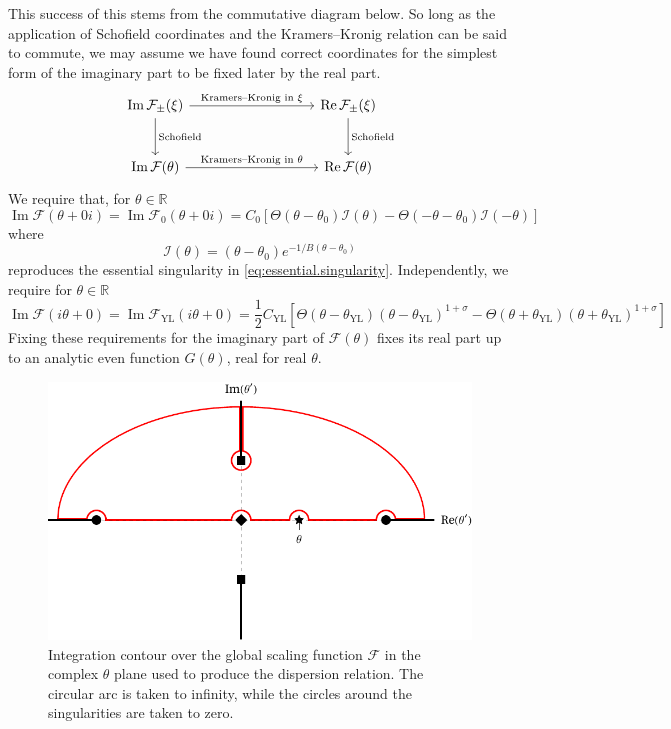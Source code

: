 \documentclass[
aps,
pre,
preprint,
longbibliography,
floatfix
]{revtex4-2}
\begin{document}
This success of this stems from the commutative diagram below. So long as the
application of Schofield coordinates and the Kramers--Kronig relation can be
said to commute, we may assume we have found correct coordinates for the
simplest form of the imaginary part to be fixed later by the real part.
\[
  \begin{tikzcd}[row sep=large, column sep = 9em]
  \operatorname{Im}\mathcal F_\pm(\xi) \arrow{r}{\text{Kramers--Kronig in $\xi$}} \arrow[]{d}{\text{Schofield}} & \operatorname{Re}\mathcal F_{\pm}(\xi) \arrow{d}{\text{Schofield}} \\%
  \operatorname{Im}\mathcal F(\theta) \arrow{r}{\text{Kramers--Kronig in $\theta$}}& \operatorname{Re}\mathcal F(\theta)
\end{tikzcd}
\]
We require that, for $\theta\in\mathbb R$
\begin{equation} \label{eq:imaginary.abrupt}
  \operatorname{Im}\mathcal F(\theta+0i)=\operatorname{Im}\mathcal F_0(\theta+0i)=C_0[\Theta(\theta-\theta_0)\mathcal I(\theta)-\Theta(-\theta-\theta_0)\mathcal I(-\theta)]
\end{equation}
where
\begin{equation}
  \mathcal I(\theta)=(\theta-\theta_0)e^{-1/B(\theta-\theta_0)}
\end{equation}
reproduces the essential singularity in \eqref{eq:essential.singularity}.
Independently, we require for $\theta\in\mathbb R$
\begin{equation}
  \operatorname{Im}\mathcal F(i\theta+0)
  =\operatorname{Im}\mathcal F_\mathrm{YL}(i\theta+0)
  =\frac12C_\mathrm{YL}\left[
    \Theta(\theta-\theta_\mathrm{YL})(\theta-\theta_\mathrm{YL})^{1+\sigma}
    -\Theta(\theta+\theta_\mathrm{YL})(\theta+\theta_\mathrm{YL})^{1+\sigma}
  \right]
\end{equation}
Fixing these requirements for the imaginary part of $\mathcal F(\theta)$ fixes
its real part up to an analytic even function $G(\theta)$, real for real $\theta$.

\begin{figure}
  \includegraphics{figs/contour_path.pdf}
  \caption{
    Integration contour over the global scaling function $\mathcal F$ in the
    complex $\theta$ plane used to produce the dispersion relation. The
    circular arc is taken to infinity, while the circles around the
    singularities are taken to zero.
  } \label{fig:contour}
\end{figure}
\end{document}
